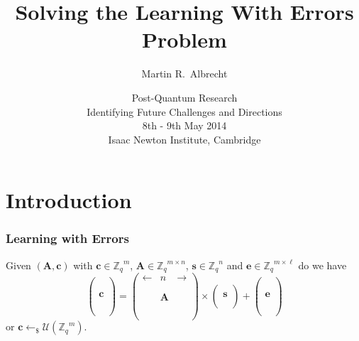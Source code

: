 \documentclass[10pt]{beamer}
\title{Solving the Learning With Errors Problem}
\author[Martin R.\ Albrecht]{Martin R.\ Albrecht}
\institute{Information Security Group, Royal Holloway, University of London}
\date{Post-Quantum Research\\Identifying Future Challenges and Directions\\8th - 9th May 2014\\Isaac Newton Institute, Cambridge}
\newcommand{\U}[1]{\ensuremath{\mathcal{U}(#1)\xspace}}
\renewcommand{\vec}[1]{\mathbf{#1}\xspace}
\newcommand{\Z}{\ensuremath{\mathbb{Z}}\xspace}
\newcommand{\Zq}{\ensuremath{\Z_q}\xspace}
\newcommand{\sample}{\ensuremath{\leftarrow_{\$}}}
\begin{document}
\begin{frame}[plain] %
  \titlepage
\end{frame}



\section{Introduction}

\begin{frame}
\frametitle{Learning with Errors}

Given $(\vec{A},\vec{c})$ with $\vec{c} \in \Zq^{m}$, $\vec{A} \in \Zq^{m \times n}$, $\vec{s} \in \Zq^{n}$ and $\vec{e} \in \Zq^{m \times \ell}$ do we have
\[
\left(
\begin{array}{c}
 \\
 \\
 \\ 
 \vec{c} \\
 \\
 \\
 \\
\end{array} 
\right) = \left(
\begin{array}{ccc}
 \leftarrow & n & \rightarrow \\
 \\
 \\ 
 & \vec{A} & \\
 \\
 \\
 \\
\end{array} \right) \times \left( \begin{array}{c}
 \\ 
 \vec{s} \\
 \\
\end{array} \right) + \left(
\begin{array}{c}
  \\
 \\
 \\ 
 \vec{e} \\
 \\
 \\
 \\
\end{array} 
\right)
\]
or $\vec{c} \sample \U{\Zq^{m}}$.
% 
% 

\end{frame}
\end{document}
